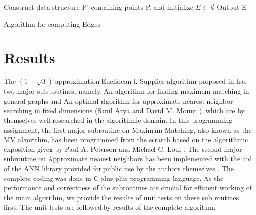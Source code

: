 \documentclass[12pt, a4paper]{article}
\begin{document}
\begin{algorithm}[H]
 Construct data structure P' containing points P, and initialize $E \gets \emptyset$\;
 Output E\;
 \caption{Algorithm for computing Edges\newline\newline}
\end{algorithm}

\section{Results}
The $(1+\sqrt{3})$ approximation Euclidean k-Supplier algorithm proposed in \cite{EuclideanKS} has two major sub-routines, namely, An algorithm for ﬁnding maximum matching in general graphs \cite{MicaliVazirani} and An optimal algorithm for approximate nearest neighbor searching in ﬁxed dimensions  (Sunil Arya and David M. Mount \cite{ANN}), which are by themselves well researched in the algorithmic domain. In this programming assignment, the first major subroutine on Maximum Matching, also known as the MV algorithm, has been programmed from the scratch based on the algorithmic exposition given by Paul A. Peterson and Michael C. Loui \cite{Exposition}. The second major subroutine on Approximate nearest neighbors has been implemented with the aid of the ANN library provided for public use by the authors themselves \cite{ANNLibrary}. The complete coding was done in C plus plus programming language. As the performance and correctness of the subroutines are crucial for efficient working of the main algorithm, we provide the results of unit tests on these sub routines first. The unit tests are followed by results of the complete algorithm.\\
\end{document}

